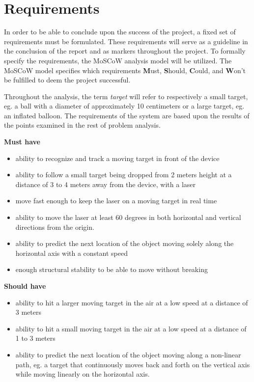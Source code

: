 \section{Requirements}
In order to be able to conclude upon the success of the project, a fixed set of requirements must be formulated.
These requirements will serve as a guideline in the conclusion of the report and as markers throughout the project. 
To formally specify the requirements, the MoSCoW analysis model will be utilized. 
The MoSCoW model specifies which requirements \textbf{M}ust, \textbf{S}hould, \textbf{C}ould, and \textbf{W}on't be fulfilled to deem the project successful.

Throughout the analysis, the term \textit{target} will refer to respectively a small target, eg{.} a ball with a diameter of approximately 10 centimeters or a large target, eg{.} an inflated balloon.
The requirements of the system are based upon the results of the points examined in the rest of problem analysis.

\textbf{Must have}
\begin{itemize}
\item ability to recognize and track a moving target in front of the device
\item ability to follow a small target being dropped from 2 meters height at a distance of 3 to 4 meters away from the device, with a laser
\item move fast enough to keep the laser on a moving target in real time
\item ability to move the laser at least 60 degrees in both horizontal and vertical directions from the origin.
\item ability to predict the next location of the object moving solely along the horizontal axis with a constant speed
\item enough structural stability to be able to move without breaking
\end{itemize}

\textbf{Should have}
\begin{itemize}
\item ability to hit a larger moving target in the air at a low speed at a distance of 3 meters
\item ability to hit a small moving target in the air at a low speed at a distance of 1 to 3 meters
\item ability to predict the next location of the object moving along a non-linear path, eg{.} a target that continuously moves back and forth on the vertical axis while moving linearly on the horizontal axis.
\end{itemize}

